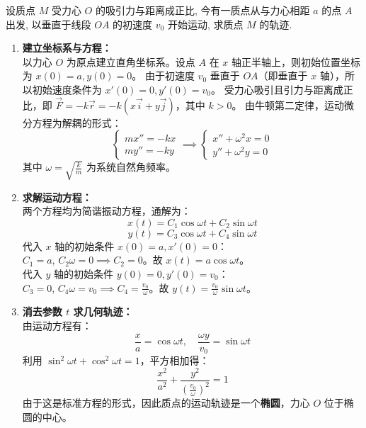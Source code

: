 \documentclass[lang=cn,11pt]{elegantbook}
\begin{document}
\begin{exercise}[有心力场中的粒子轨迹]
设质点 $M$ 受力心 $O$ 的吸引力与距离成正比, 今有一质点从与力心相距 $a$ 的点 $A$ 出发, 以垂直于线段 $OA$ 的初速度 $v_0$ 开始运动, 求质点 $M$ 的轨迹.
\end{exercise}
\begin{solution}
\begin{enumerate}
    \item \textbf{建立坐标系与方程：}\\
    以力心 $O$ 为原点建立直角坐标系。设点 $A$ 在 $x$ 轴正半轴上，则初始位置坐标为 $x(0) = a, y(0) = 0$。
    由于初速度 $v_0$ 垂直于 $OA$（即垂直于 $x$ 轴），所以初始速度条件为 $x'(0) = 0, y'(0) = v_0$。
    受力心吸引且引力与距离成正比，即 $\vec{F} = -k\vec{r} = -k(x\vec{i} + y\vec{j})$，其中 $k>0$。
    由牛顿第二定律，运动微分方程为解耦的形式：
    \[
    \begin{cases}
    m x'' = -kx \\
    m y'' = -ky
    \end{cases}
    \implies
    \begin{cases}
    x'' + \omega^2 x = 0 \\
    y'' + \omega^2 y = 0
    \end{cases}
    \]
    其中 $\omega = \sqrt{\frac{k}{m}}$ 为系统自然角频率。
    \item \textbf{求解运动方程：}\\
    两个方程均为简谐振动方程，通解为：
    \[
    x(t) = C_1\cos\omega t + C_2\sin\omega t
    \]
    \[
    y(t) = C_3\cos\omega t + C_4\sin\omega t
    \]
    代入 $x$ 轴的初始条件 $x(0)=a, x'(0)=0$：\\
    $C_1 = a$, $C_2\omega = 0 \implies C_2 = 0$。故 $x(t) = a\cos\omega t$。\\
    代入 $y$ 轴的初始条件 $y(0)=0, y'(0)=v_0$：\\
    $C_3 = 0$, $C_4\omega = v_0 \implies C_4 = \frac{v_0}{\omega}$。故 $y(t) = \frac{v_0}{\omega}\sin\omega t$。
    \item \textbf{消去参数 $t$ 求几何轨迹：}\\
    由运动方程有：
    \[
    \frac{x}{a} = \cos\omega t, \quad \frac{\omega y}{v_0} = \sin\omega t
    \]
    利用 $\sin^2\omega t + \cos^2\omega t = 1$，平方相加得：
    \[
    \boxed{\frac{x^2}{a^2} + \frac{y^2}{\left(\frac{v_0}{\omega}\right)^2} = 1}
    \]
    由于这是标准方程的形式，因此质点的运动轨迹是一个\textbf{椭圆}，力心 $O$ 位于椭圆的中心。
\end{enumerate}
\end{solution}
\end{document}
